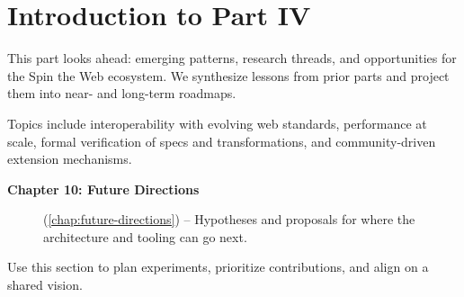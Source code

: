 
\chapter*{Introduction to Part IV}
\label{part:future}

This part looks ahead: emerging patterns, research threads, and opportunities for the Spin the Web ecosystem. We synthesize lessons from prior parts and project them into near- and long-term roadmaps.

Topics include interoperability with evolving web standards, performance at scale, formal verification of specs and transformations, and community-driven extension mechanisms.

\begin{description}
	\item[\textbf{Chapter 10: Future Directions}] (\cref{chap:future-directions}) -- Hypotheses and proposals for where the architecture and tooling can go next.
\end{description}

Use this section to plan experiments, prioritize contributions, and align on a shared vision.
